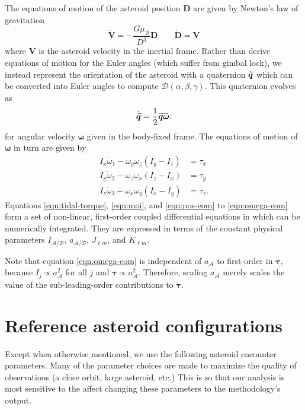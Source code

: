 The equations of motion of the asteroid position $\bm D$ are given by Newton's law of gravitation
\begin{equation}
  \dot{\bm V} = -\frac{G \mu_\mathcal{B}}{D^3} \bm D \qquad \dot{\bm D} = \bm V
  \label{eqn:pos-eom}
\end{equation}
where $\bm V$ is the asteroid velocity in the inertial frame. Rather than derive equations of motion for the Euler angles (which suffer from gimbal lock), we instead represent the orientation of the asteroid with a quaternion $\widetilde{\bm{q}}$ which can be converted into Euler angles to compute $\mathcal{D}(\alpha, \beta, \gamma)$. This quaternion evolves as 
\begin{equation}
  \dot{\widetilde{\bm{q}}} = \frac{1}{2}\widetilde{\bm{q}}\widetilde{\bm{\omega}}.
  \label{eqn:quat-eom}
\end{equation}
for angular velocity $\bm \omega$ given in the body-fixed frame. The equations of motion of $\bm \omega$ in turn are given by
\begin{equation}
  \begin{split}
    I_x \dot \omega_1 - \omega_y \omega_z (I_y - I_z) &= \tau_x\\
    I_y \dot \omega_2 - \omega_z \omega_x (I_z - I_x) &= \tau_y\\
    I_z \dot \omega_3 - \omega_x \omega_y (I_x - I_y) &= \tau_z.
  \end{split}
  \label{eqn:omega-eom}
\end{equation}
Equations \ref{eqn:tidal-torque}, \ref{eqn:moi}, and \ref{eqn:pos-eom} to \ref{eqn:omega-eom} form a set of non-linear, first-order coupled differential equations in which can be numerically integrated. They are expressed in terms of the constant physical parameters $I_\mathcal{A/B}$, $a_\mathcal{A/B}$, $J_{\ell m}$, and $K_{\ell m}$.

Note that equation \ref{eqn:omega-eom} is independent of $a_\mathcal{A}$ to first-order in $\bm \tau$, because $I_{j} \propto a_\mathcal{A}^2$ for all $j$ and $\bm \tau \propto a_\mathcal{A}^2$. Therefore, scaling $a_\mathcal{A}$ merely scales the value of the sub-leading-order contributions to $\bm \tau$.




\section{Reference asteroid configurations}
\label{app:reference-configs}

Except when otherwise mentioned, we use the following asteroid encounter parameters. Many of the parameter choices are made to maximize the quality of observations (a close orbit, large asteroid, etc.) This is so that our analysis is most sensitive to the affect changing these parameters to the methodology's output.

